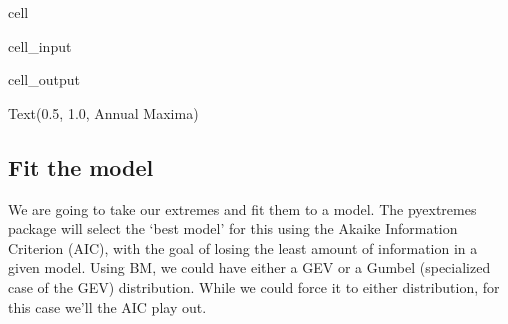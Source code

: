 \documentclass[letterpaper,10pt,english]{jupyterBook}
\begin{document}
\begin{sphinxuseclass}{cell}\begin{sphinxVerbatimInput}

\begin{sphinxuseclass}{cell_input}
\begin{sphinxVerbatim}[commandchars=\\\{\}]
   
\end{sphinxVerbatim}

\end{sphinxuseclass}\end{sphinxVerbatimInput}
\begin{sphinxVerbatimOutput}

\begin{sphinxuseclass}{cell_output}
\begin{sphinxVerbatim}[commandchars=\\\{\}]
Text(0.5, 1.0, \PYGZsq{}Annual Maxima\PYGZsq{})
\end{sphinxVerbatim}

\noindent{}

\end{sphinxuseclass}\end{sphinxVerbatimOutput}

\end{sphinxuseclass}

\subsection{Fit the model}
\label{\detokenize{notebooks/regional_and_local/SL_Extremes_annual:fit-the-model}}
\sphinxAtStartPar
We are going to take our extremes and fit them to a model. The pyextremes package will select the ‘best model’ for this using the Akaike Information Criterion (AIC), with the goal of losing the least amount of information in a given model. Using BM, we could have either a GEV or a Gumbel (specialized case of the GEV) distribution. While we could force it to either distribution, for this case we’ll the AIC play out.
\end{document}
